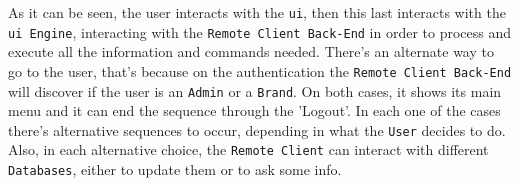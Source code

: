 As it can be seen, the user interacts with the \texttt{\gls{ui}}, then this last interacts with the \texttt{\gls{ui} Engine}, interacting with the \texttt{Remote Client Back-End} in order to process and execute all the information and commands needed. 
There's an alternate way to go to the user, that's because on the authentication the \texttt{Remote Client Back-End} will discover if the user is an \texttt{Admin} or a \texttt{Brand}.
On both cases, it shows its main menu and it can end the sequence through the 'Logout'.
In each one of the cases there's alternative sequences to occur, depending in what the \texttt{User} decides to do.
Also, in each alternative choice, the \texttt{Remote Client} can interact with different \texttt{Databases}, either to update them or to ask some info.

